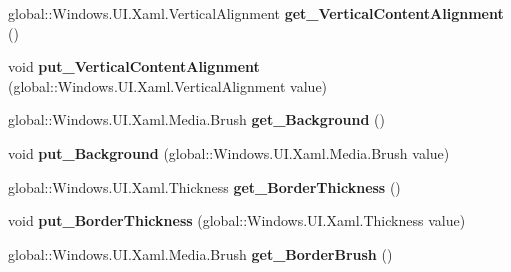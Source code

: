 \begin{DoxyCompactItemize}
\mbox{\label{interface_windows_1_1_u_i_1_1_xaml_1_1_controls_1_1_i_control_ae586ce721d361940da51fcefd32816c7}} 
global\+::\+Windows.\+U\+I.\+Xaml.\+Vertical\+Alignment {\bfseries get\+\_\+\+Vertical\+Content\+Alignment} ()
\item 
\mbox{\label{interface_windows_1_1_u_i_1_1_xaml_1_1_controls_1_1_i_control_a44b19573be16bc17ab68814c38bc6981}} 
void {\bfseries put\+\_\+\+Vertical\+Content\+Alignment} (global\+::\+Windows.\+U\+I.\+Xaml.\+Vertical\+Alignment value)
\item 
\mbox{\label{interface_windows_1_1_u_i_1_1_xaml_1_1_controls_1_1_i_control_aac29873ebb350b3b04070ed6664351eb}} 
global\+::\+Windows.\+U\+I.\+Xaml.\+Media.\+Brush {\bfseries get\+\_\+\+Background} ()
\item 
\mbox{\label{interface_windows_1_1_u_i_1_1_xaml_1_1_controls_1_1_i_control_a3ff4d65a6273f87cf0e2f0258e70a641}} 
void {\bfseries put\+\_\+\+Background} (global\+::\+Windows.\+U\+I.\+Xaml.\+Media.\+Brush value)
\item 
\mbox{\label{interface_windows_1_1_u_i_1_1_xaml_1_1_controls_1_1_i_control_a368b66c8a1f1040880bdefc07e7cb85b}} 
global\+::\+Windows.\+U\+I.\+Xaml.\+Thickness {\bfseries get\+\_\+\+Border\+Thickness} ()
\item 
\mbox{\label{interface_windows_1_1_u_i_1_1_xaml_1_1_controls_1_1_i_control_ab6fd6e86f54e793f12961312b55b372f}} 
void {\bfseries put\+\_\+\+Border\+Thickness} (global\+::\+Windows.\+U\+I.\+Xaml.\+Thickness value)
\item 
\mbox{\label{interface_windows_1_1_u_i_1_1_xaml_1_1_controls_1_1_i_control_a1abfbeb7516aaa3813e93972e9cd5675}} 
global\+::\+Windows.\+U\+I.\+Xaml.\+Media.\+Brush {\bfseries get\+\_\+\+Border\+Brush} ()
\item 
\mbox{\label{interface_windows_1_1_u_i_1_1_xaml_1_1_controls_1_1_i_control_a4c2d7d5305d305b773e5ad689a8890bd}} 

\end{DoxyCompactItemize}
